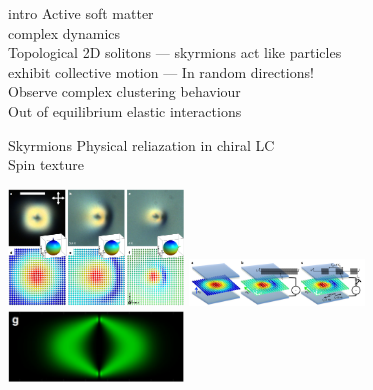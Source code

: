 \documentclass[t, 11pt, xcolor=dvipsnames]{beamer}
\begin{document}
\begin{frame}[plain]{intro}
  Active soft matter \\
  complex dynamics \\
  Topological 2D solitons --- skyrmions act like particles \\
  exhibit collective motion --- In random directions! \\
  Observe complex clustering behaviour \\
  Out of equilibrium elastic interactions \\
  \hypertarget<1>{slide2}{}
\end{frame}

\begin{frame}[plain]{Skyrmions}
  Physical reliazation in chiral LC \\
  Spin texture \\
  \begin{center}
    \includegraphics[width=0.35\textwidth]{images/skyrm.png}
    \includegraphics[width=0.35\textwidth]{images/plate.png}
    \includegraphics[width=0.35\textwidth]{images/cross_sec.png}
  \end{center}
\end{frame}
\end{document}
